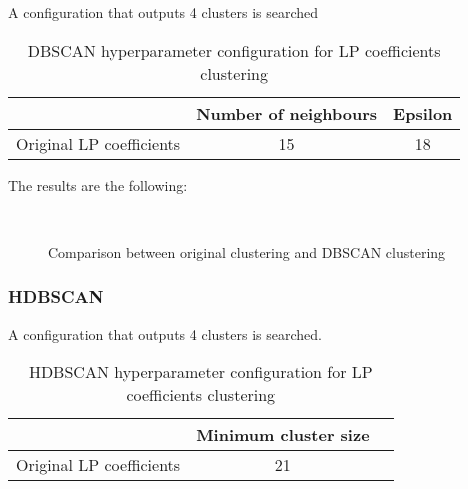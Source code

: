 			A configuration that outputs 4 clusters is searched
			
			\begin{table}[h!]
				\centering
				\begin{tabular}{|c|c|c|}
					\hline
					& \textbf{Number of neighbours} & \textbf{Epsilon}\\
					\hline
					Original LP coefficients & 15 & 18\\
				\end{tabular}
				\caption{DBSCAN hyperparameter configuration for LP coefficients clustering}
			\end{table}
		
			The results are the following:
			
			\begin{figure*}[ht!]
				\centering
				\hspace{\fill}
				\\
					
				\hspace{\fill}
				\caption{Comparison between original clustering and DBSCAN clustering}
			\end{figure*}
			\FloatBarrier
		
		\subsubsection{HDBSCAN}
			
			A configuration that outputs 4 clusters is searched.
			
			\begin{table}[h!]
				\centering
				\begin{tabular}{|c|c|c|}
					\hline
					& \textbf{Minimum cluster size} \\
					\hline
					Original LP coefficients & 21 \\
				\end{tabular}
				\caption{HDBSCAN hyperparameter configuration for LP coefficients clustering}
			\end{table}
			\FloatBarrier
			

